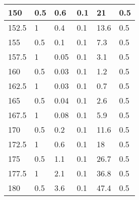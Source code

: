 \begin{center}
\begin{longtable}{|l|l|l|l|l|l|}
150   & 0.5         & 0.6             & 0.1         & 21            & 0.5           \\ \hline
152.5 & 1           & 0.4             & 0.1         & 13.6          & 0.5           \\ \hline
155   & 0.5         & 0.1             & 0.1         & 7.3           & 0.5           \\ \hline
157.5 & 1           & 0.05            & 0.1         & 3.1           & 0.5           \\ \hline
160   & 0.5         & 0.03            & 0.1         & 1.2           & 0.5           \\ \hline
162.5 & 1           & 0.03            & 0.1         & 0.7           & 0.5           \\ \hline
165   & 0.5         & 0.04            & 0.1         & 2.6           & 0.5           \\ \hline
167.5 & 1           & 0.08            & 0.1         & 5.9           & 0.5           \\ \hline
170   & 0.5         & 0.2             & 0.1         & 11.6          & 0.5           \\ \hline
172.5 & 1           & 0.6             & 0.1         & 18            & 0.5           \\ \hline
175   & 0.5         & 1.1             & 0.1         & 26.7          & 0.5           \\ \hline
177.5 & 1           & 2.1             & 0.1         & 36.8          & 0.5           \\ \hline
180   & 0.5         & 3.6             & 0.1         & 47.4          & 0.5           \\ \hline
\end{longtable}
\end{center}


